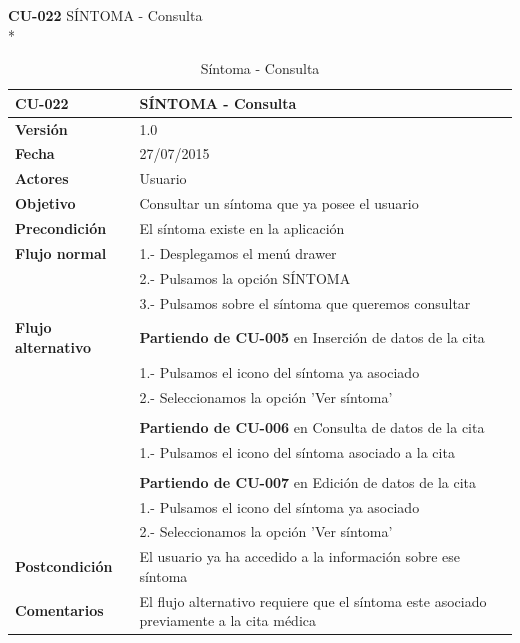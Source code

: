 \documentclass[../pfc.tex]{subfiles}
\begin{document}
	\clearpage
	
	\textbf{CU-022}	SÍNTOMA - Consulta\\*
	
	\begin{table}[H]
		\centering
		\begin{tabular}[t]{|p{3cm}|p{9.5cm}|}
			\hline \textbf{CU-022} & \textbf{SÍNTOMA - Consulta} \\*
			\hline\hline \textbf{Versión} & 1.0 \\*
			\hline\hline \textbf{Fecha} & 27/07/2015 \\*
			\hline\textbf{Actores} 	& Usuario\\*
			\hline \textbf{Objetivo} & Consultar un síntoma que ya posee el usuario\\* 			
			\hline \textbf{Precondición} & El síntoma existe en la aplicación\\* 
			\hline \textbf{Flujo normal} & 1.- Desplegamos el menú drawer \\* 
			& 2.- Pulsamos la opción SÍNTOMA\\*	
			& 3.- Pulsamos sobre el síntoma que queremos consultar\\*	
			\hline \textbf{Flujo alternativo} & \textbf{Partiendo de CU-005} en Inserción de datos de la cita\\* 
			& 1.- Pulsamos el icono del síntoma ya asociado\\*	
			& 2.- Seleccionamos la opción 'Ver síntoma'\\*
			& \\*
			& \textbf{Partiendo de CU-006} en Consulta de datos de la cita\\* 
			& 1.- Pulsamos el icono del síntoma asociado a la cita\\*	
			& \\*
			& \textbf{Partiendo de CU-007} en Edición de datos de la cita\\* 
			& 1.- Pulsamos el icono del síntoma ya asociado\\*	
			& 2.- Seleccionamos la opción 'Ver síntoma'\\*
			\hline \textbf{Postcondición} & El usuario ya ha accedido a la información sobre ese síntoma \\* 
			\hline \textbf{Comentarios}   & El flujo alternativo requiere que el síntoma  este asociado previamente a la cita médica\\*
			\hline
		\end{tabular}
		\caption{Síntoma - Consulta}
		\label{tabla:caso022}
	\end{table}
	
\end{document}
